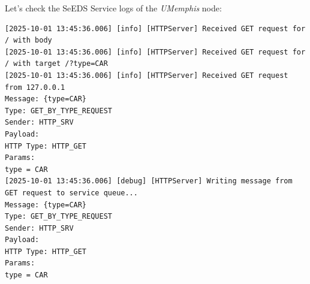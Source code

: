 \documentclass{article}
\begin{document}
Let's check the SeEDS Service logs of the \emph{UMemphis} node: 
\begin{lstlisting}[language=log, caption={Logs of the SeEDS Service of the \emph{UMemphis} node, after getting a response from \emph{GET by TYPE}}, label={lst:get-by-type-umemphis}]
[2025-10-01 13:45:36.006] [info] [HTTPServer] Received GET request for / with body 
[2025-10-01 13:45:36.006] [info] [HTTPServer] Received GET request for / with target /?type=CAR
[2025-10-01 13:45:36.006] [info] [HTTPServer] Received GET request from 127.0.0.1
Message: {type=CAR}
Type: GET_BY_TYPE_REQUEST
Sender: HTTP_SRV
Payload: 
HTTP Type: HTTP_GET
Params:
type = CAR
[2025-10-01 13:45:36.006] [debug] [HTTPServer] Writing message from GET request to service queue...
Message: {type=CAR}
Type: GET_BY_TYPE_REQUEST
Sender: HTTP_SRV
Payload: 
HTTP Type: HTTP_GET
Params:
type = CAR


\end{lstlisting}
\end{document}
